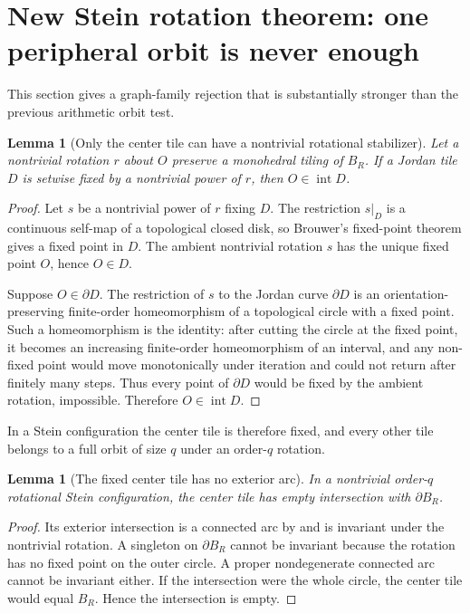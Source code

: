 \documentclass[11pt]{article}
\newtheorem{lemma}[theorem]{Lemma}
\theoremstyle{definition}
\theoremstyle{remark}
\newcommand{\BR}{B_R}
\newcommand{\interior}{\operatorname{int}}
\begin{document}
\section{New Stein rotation theorem: one peripheral orbit is never enough}
\label{sec:stein-rotation}

This section gives a graph-family rejection that is substantially stronger than the previous arithmetic orbit test.

\begin{lemma}[Only the center tile can have a nontrivial rotational stabilizer]
\label{lem:stabilizer}
Let a nontrivial rotation $r$ about $O$ preserve a monohedral tiling of $\BR$.  If a Jordan tile $D$ is setwise fixed by a nontrivial power of $r$, then $O\in\interior D$.
\end{lemma}

\begin{proof}
Let $s$ be a nontrivial power of $r$ fixing $D$.  The restriction $s|_D$ is a continuous self-map of a topological closed disk, so Brouwer's fixed-point theorem gives a fixed point in $D$.  The ambient nontrivial rotation $s$ has the unique fixed point $O$, hence $O\in D$.

Suppose $O\in\partial D$.  The restriction of $s$ to the Jordan curve $\partial D$ is an orientation-preserving finite-order homeomorphism of a topological circle with a fixed point.  Such a homeomorphism is the identity: after cutting the circle at the fixed point, it becomes an increasing finite-order homeomorphism of an interval, and any non-fixed point would move monotonically under iteration and could not return after finitely many steps.  Thus every point of $\partial D$ would be fixed by the ambient rotation, impossible.  Therefore $O\in\interior D$.
\end{proof}

In a Stein configuration the center tile is therefore fixed, and every other tile belongs to a full orbit of size $q$ under an order-$q$ rotation.

\begin{lemma}[The fixed center tile has no exterior arc]
\label{lem:center-no-outer}
In a nontrivial order-$q$ rotational Stein configuration, the center tile has empty intersection with $\partial\BR$.
\end{lemma}

\begin{proof}
Its exterior intersection is a connected arc by \cite{KLV2020} and is invariant under the nontrivial rotation.  A singleton on $\partial\BR$ cannot be invariant because the rotation has no fixed point on the outer circle.  A proper nondegenerate connected arc cannot be invariant either.  If the intersection were the whole circle, the center tile would equal $\BR$.  Hence the intersection is empty.
\end{proof}
\end{document}
